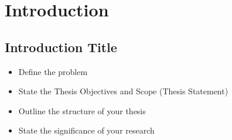 \chapter{Introduction}

\section{Introduction Title}
\begin{itemize}
  \item Define the problem
  \item State the Thesis Objectives and Scope (Thesis Statement)
  \item Outline the structure of your thesis
  \item State the significance of your research
\end{itemize}

